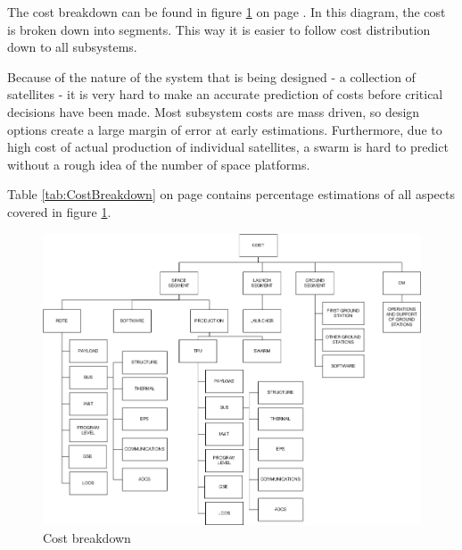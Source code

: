 The cost breakdown can be found in figure \ref{fig:costbreak} on page \pageref{fig:costbreak}. In this diagram, the cost is broken down into segments. This way it is easier to follow cost distribution down to all subsystems.

Because of the nature of the system that is being designed - a collection of satellites - it is very hard to make an accurate prediction of costs before critical decisions have been made. Most subsystem costs are mass driven, so design options create a large margin of error at early estimations. Furthermore, due to high cost of actual production of individual satellites, a swarm is hard to predict without a rough idea of the number of space platforms.

Table \ref{tab:CostBreakdown} on page \pageref{tab:CostBreakdown} contains percentage estimations of all aspects covered in figure \ref{fig:costbreak}.

\begin{figure}[H]
\begin{center}

\includegraphics[width=1.0\textwidth,angle=90]{chapters/img/costbreakdown.jpg}
\caption{Cost breakdown}
\label{fig:costbreak}
\end{center}
\end{figure}

